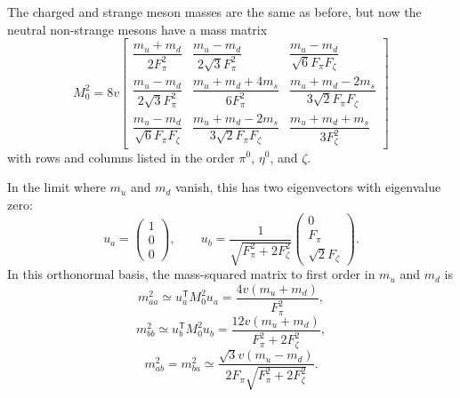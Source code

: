 The charged and strange meson masses are the same as before, but now the neutral non-strange mesons have a mass matrix
\begin{equation}
M_0^2=8v
\begin{bmatrix}
\dfrac{m_u+m_d}{2F_\pi^2}
&
\dfrac{m_u-m_d}{2\sqrt3F_\pi^2}
&
\dfrac{m_u-m_d}{\sqrt6F_\pi F_\zeta}
\\[8pt]
\dfrac{m_u-m_d}{2\sqrt3F_\pi^2}
&
\dfrac{m_u+m_d+4m_s}{6F_\pi^2}
&
\dfrac{m_u+m_d-2m_s}{3\sqrt2F_\pi F_\zeta}
\\[8pt]
\dfrac{m_u-m_d}{\sqrt6F_\pi F_\zeta}
&
\dfrac{m_u+m_d-2m_s}{3\sqrt2F_\pi F_\zeta}
&
\dfrac{m_u+m_d+m_s}{3F_\zeta^2}
\end{bmatrix}
\tag{19.10.7}\label{eq:19.10.7}
\end{equation}
with rows and columns listed in the order $\pi^0$, $\eta^0$, and $\zeta$.

In the limit where $m_u$ and $m_d$ vanish, this has two eigenvectors with eigenvalue zero:
\begin{equation}
u_a=
\begin{pmatrix}1\\0\\0\end{pmatrix},
\qquad
u_b=
\frac{1}{\sqrt{F_\pi^2+2F_\zeta^2}}
\begin{pmatrix}0\\F_\pi\\\sqrt2F_\zeta\end{pmatrix}.
\tag{19.10.8}\label{eq:19.10.8}
\end{equation}
In this orthonormal basis, the mass-squared matrix to first order in $m_u$ and $m_d$ is
\begin{equation}
m_{aa}^2\simeq u_a^{\mathsf T}M_0^2u_a
=\frac{4v(m_u+m_d)}{F_\pi^2},
\tag{19.10.9}\label{eq:19.10.9}
\end{equation}
\begin{equation}
m_{bb}^2\simeq u_b^{\mathsf T}M_0^2u_b
=\frac{12v(m_u+m_d)}{F_\pi^2+2F_\zeta^2},
\tag{19.10.10}\label{eq:19.10.10}
\end{equation}
\begin{equation}
m_{ab}^2=m_{ba}^2
\simeq
\frac{\sqrt3v(m_u-m_d)}
{2F_\pi\sqrt{F_\pi^2+2F_\zeta^2}}.
\tag{19.10.11}\label{eq:19.10.11}
\end{equation}


